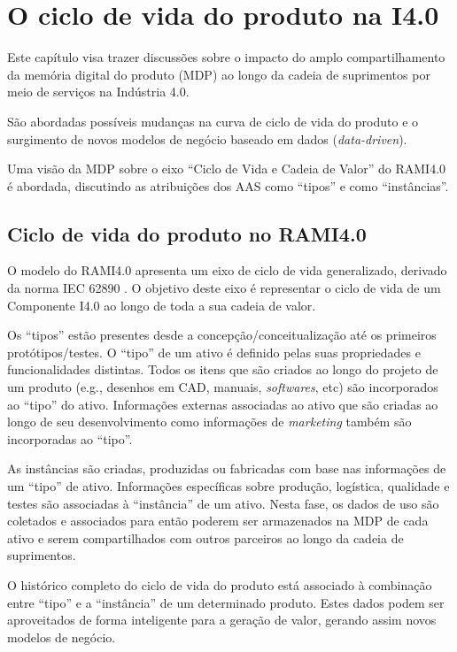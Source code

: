 \chapter{O ciclo de vida do produto na I4.0}
\label{cha:ciclo-de-vida}

Este capítulo visa trazer discussões sobre o impacto do amplo compartilhamento da memória digital do produto (MDP) ao longo da cadeia de suprimentos por meio de serviços na Indústria 4.0.

São abordadas possíveis mudanças na curva de ciclo de vida do produto e o surgimento de novos modelos de negócio baseado em dados (\textit{data-driven}).

Uma visão da MDP sobre o eixo ``Ciclo de Vida e Cadeia de Valor'' do RAMI4.0 é abordada, discutindo as atribuições dos AAS como ``tipos'' e como ``instâncias''.

\section{Ciclo de vida do produto no RAMI4.0}

O modelo do RAMI4.0 apresenta um eixo de ciclo de vida generalizado, derivado da norma IEC 62890 \cite{adolphs2015rami}. O objetivo deste eixo é representar o ciclo de vida de um Componente I4.0 ao longo de toda a sua cadeia de valor.

Os ``tipos'' estão presentes desde a concepção/conceitualização até os primeiros protótipos/testes. O ``tipo'' de um ativo é definido pelas suas propriedades e funcionalidades distintas. Todos os itens que são criados ao longo do projeto de um produto (e.g., desenhos em CAD, manuais, \textit{softwares}, etc) são incorporados ao ``tipo'' do ativo. Informações externas associadas ao ativo que são criadas ao longo de seu desenvolvimento como informações de \textit{marketing} também são incorporadas ao ``tipo''.

As instâncias são criadas, produzidas ou fabricadas com base nas informações de um ``tipo'' de ativo. Informações específicas sobre produção, logística, qualidade e testes são associadas à ``instância'' de um ativo. Nesta fase, os dados de uso são coletados e associados para então poderem ser armazenados na MDP de cada ativo e serem compartilhados com outros parceiros ao longo da cadeia de suprimentos.

O histórico completo do ciclo de vida do produto está associado à combinação entre ``tipo'' e a ``instância'' de um determinado produto. Estes dados podem ser aproveitados de forma inteligente para a geração de valor, gerando assim novos modelos de negócio.

